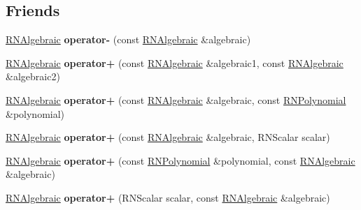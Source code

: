 \subsection*{Friends}
\begin{DoxyCompactItemize}
\item 
\hyperlink{class_r_n_algebraic}{R\+N\+Algebraic} {\bfseries operator-\/} (const \hyperlink{class_r_n_algebraic}{R\+N\+Algebraic} \&algebraic)\hypertarget{class_r_n_algebraic_ac46479841f3033469384d300b64f760f}{}\label{class_r_n_algebraic_ac46479841f3033469384d300b64f760f}

\item 
\hyperlink{class_r_n_algebraic}{R\+N\+Algebraic} {\bfseries operator+} (const \hyperlink{class_r_n_algebraic}{R\+N\+Algebraic} \&algebraic1, const \hyperlink{class_r_n_algebraic}{R\+N\+Algebraic} \&algebraic2)\hypertarget{class_r_n_algebraic_a1b0b2cda6bd9ec17e38dc1c446f1b925}{}\label{class_r_n_algebraic_a1b0b2cda6bd9ec17e38dc1c446f1b925}

\item 
\hyperlink{class_r_n_algebraic}{R\+N\+Algebraic} {\bfseries operator+} (const \hyperlink{class_r_n_algebraic}{R\+N\+Algebraic} \&algebraic, const \hyperlink{class_r_n_polynomial}{R\+N\+Polynomial} \&polynomial)\hypertarget{class_r_n_algebraic_acdf5395b56195d06decdd01e175f3446}{}\label{class_r_n_algebraic_acdf5395b56195d06decdd01e175f3446}

\item 
\hyperlink{class_r_n_algebraic}{R\+N\+Algebraic} {\bfseries operator+} (const \hyperlink{class_r_n_algebraic}{R\+N\+Algebraic} \&algebraic, R\+N\+Scalar scalar)\hypertarget{class_r_n_algebraic_ae3a15d391361dd155ab0309da6e64d2f}{}\label{class_r_n_algebraic_ae3a15d391361dd155ab0309da6e64d2f}

\item 
\hyperlink{class_r_n_algebraic}{R\+N\+Algebraic} {\bfseries operator+} (const \hyperlink{class_r_n_polynomial}{R\+N\+Polynomial} \&polynomial, const \hyperlink{class_r_n_algebraic}{R\+N\+Algebraic} \&algebraic)\hypertarget{class_r_n_algebraic_a12e19e23b849858d0a5c53c85d040b50}{}\label{class_r_n_algebraic_a12e19e23b849858d0a5c53c85d040b50}

\item 
\hyperlink{class_r_n_algebraic}{R\+N\+Algebraic} {\bfseries operator+} (R\+N\+Scalar scalar, const \hyperlink{class_r_n_algebraic}{R\+N\+Algebraic} \&algebraic)\hypertarget{class_r_n_algebraic_ad31f6d1463f112494815829307a265e6}{}\label{class_r_n_algebraic_ad31f6d1463f112494815829307a265e6}


\end{DoxyCompactItemize}
